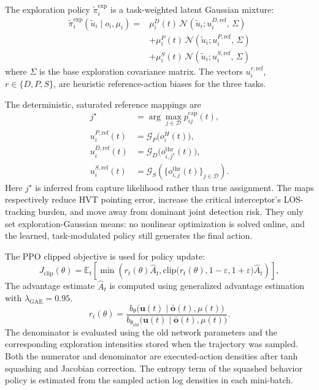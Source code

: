 \documentclass{cja}
\begin{document}
The exploration policy $\widetilde\pi_i^{\mathrm{exp}}$ is a task-weighted latent Gaussian mixture:
\begin{equation}
\begin{aligned}
\widetilde\pi_i^{\mathrm{exp}}(\widetilde u_i\mid o_i,\mu_i)
={}&
\mu_i^D(t)\,\mathcal{N}\!\left(\widetilde u_i;u_i^{D,\mathrm{ref}},\,\Sigma\right)\\
&+
\mu_i^P(t)\,\mathcal{N}\!\left(\widetilde u_i;u_i^{P,\mathrm{ref}},\,\Sigma\right)\\
&+
\mu_i^S(t)\,\mathcal{N}\!\left(\widetilde u_i;u_i^{S,\mathrm{ref}},\,\Sigma\right)
\end{aligned}
\end{equation}
where $\Sigma$ is the base exploration covariance matrix. The vectors $u_i^{r,\mathrm{ref}}$, $r\in\{D,P,S\}$, are heuristic reference-action biases for the three tasks.

The deterministic, saturated reference mappings are
\begin{equation}
\begin{aligned}
j^\star
&=\arg\max_{j\in\mathcal D}p_{ij}^{\mathrm{cap}}(t),\\
u_i^{P,\mathrm{ref}}(t)
&=\mathcal G_P\bigl(o_i^H(t)\bigr),\\
u_i^{D,\mathrm{ref}}(t)
&=\mathcal G_D\bigl(o_{i,j^\star}^{\mathrm{thr}}(t)\bigr),\\
u_i^{S,\mathrm{ref}}(t)
&=\mathcal G_S\!\left(\{o_{i,j}^{\mathrm{thr}}(t)\}_{j\in\mathcal D}\right).
\end{aligned}
\end{equation}
Here $j^\star$ is inferred from capture likelihood rather than true assignment. The maps respectively reduce HVT pointing error, increase the critical interceptor's LOS-tracking burden, and move away from dominant joint detection risk. They only set exploration-Gaussian means: no nonlinear optimization is solved online, and the learned, task-modulated policy still generates the final action.

The PPO clipped objective is used for policy update:
\begin{equation}
J_{\mathrm{clip}}(\theta)
=
\mathbb E_t
\left[
\min
\left(
r_t(\theta)\hat A_t,
\mathrm{clip}\bigl(r_t(\theta),1-\varepsilon,1+\varepsilon\bigr)\hat A_t
\right)
\right],
\end{equation}
The advantage estimate $\hat A_t$ is computed using generalized advantage estimation with $\lambda_{\mathrm{GAE}}=0.95$.
\begin{equation}
r_t(\theta)
=
\frac{
b_{\theta}\bigl(\mathbf u(t)\mid \bar{\mathbf o}(t),\mu(t)\bigr)
}{
b_{\theta_{\mathrm{old}}}\bigl(\mathbf u(t)\mid \bar{\mathbf o}(t),\mu(t)\bigr)
}.
\end{equation}
The denominator is evaluated using the old network parameters and the corresponding exploration intensities stored when the trajectory was sampled. Both the numerator and denominator are executed-action densities after tanh squashing and Jacobian correction.
The entropy term of the squashed behavior policy is estimated from the sampled action log densities in each mini-batch.
\end{document}
